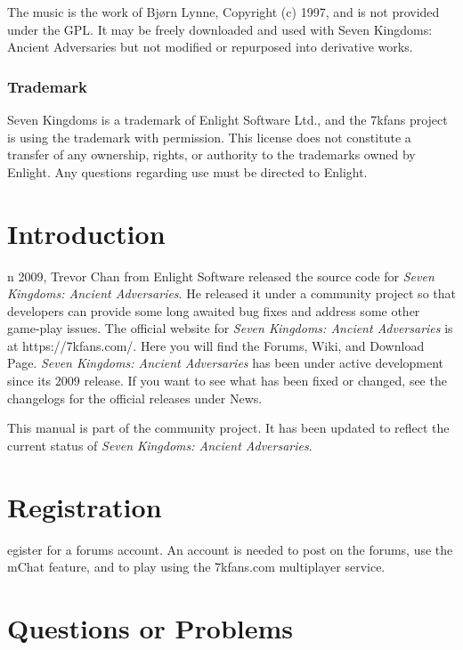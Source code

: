 \documentclass[openany]{book}
\begin{document}
The music is the work of Bjørn Lynne, Copyright (c) 1997, and is not provided under the GPL. It may be freely downloaded and used with Seven Kingdoms: Ancient Adversaries but not modified or repurposed into derivative works.

\subsubsection{Trademark}

Seven Kingdoms is a trademark of Enlight Software Ltd., and the 7kfans project is using the trademark with permission. This license does not constitute a transfer of any ownership, rights, or authority to the trademarks owned by Enlight. Any questions regarding use must be directed to Enlight.

\clearpage

\section{Introduction}

n 2009, Trevor Chan from Enlight Software released the source code for \textit{Seven Kingdoms: Ancient Adversaries}. He released it under a community project so that developers can provide some long awaited bug fixes and address some other game-play issues. The official website for \textit{Seven Kingdoms: Ancient Adversaries} is at https://7kfans.com/. Here you will find the Forums, Wiki, and Download Page. \textit{Seven Kingdoms: Ancient Adversaries} has been under active development since its 2009 release. If you want to see what has been fixed or changed, see the changelogs for the official releases under News. 

This manual is part of the community project. It has been updated to reflect the current status of \textit{Seven Kingdoms: Ancient Adversaries}.

\section{Registration}


egister for a forums account. An account is needed to post on the forums, use the mChat feature, and to play using the 7kfans.com multiplayer service.

\section{Questions or Problems}
\end{document}
